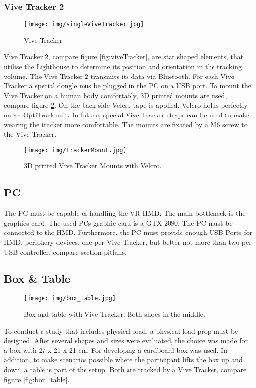 \subsubsection{Vive Tracker 2}
\begin{figure}
	\centering
	\texttt{[image: img/singleViveTracker.jpg]}
	\caption{Vive Tracker}
	\label{fig:singleViveTracker}
\end{figure}
Vive Tracker 2, compare figure \ref{fig:viveTracker}, are star shaped elements, that utilise the Lighthouse to determine its position and orientation in the tracking volume. The Vive Tracker 2 transmits its data via Bluetooth. For each Vive Tracker a special dongle mus be plugged in the PC on a USB port. To mount the Vive Tracker on a human body comfortably, 3D printed mounts are used, compare figure \ref{fig:trackerMount}. On the back side Velcro tape is applied. Velcro holds perfectly on an OptiTrack suit. In future, special Vive Tracker straps can be used to make wearing the tracker more comfortable. The mounts are fixated by a M6 screw to the Vive Tracker.
\begin{figure}
	\centering
	\texttt{[image: img/trackerMount.jpg]}
	\caption{3D printed Vive Tracker Mounts with Velcro.}
	\label{fig:trackerMount}
\end{figure}

\subsection{PC}
The PC must be capable of handling the VR HMD. The main bottleneck is the graphics card. The used PCs graphic card is a GTX 2080. The PC must be connected to the HMD. Furthermore, the PC must provide enough USB Ports for HMD, periphery devices, one per Vive Tracker, but better not more than two per USB controller, compare section pitfalls.

\subsection{Box \& Table}
\begin{figure}
	\centering
	\texttt{[image: img/box\_table.jpg]}
	\caption{Box and table with Vive Tracker. Both shoes in the middle.}
\end{figure}

To conduct a study that includes physical load, a physical load prop must be designed. After several shapes and sizes were evaluated, the choice was made for a box with 27 x 21 x 21 cm. For developing a cardboard box was used. In addition, to make scenarios possible where the participant lifts the box up and down, a table is part of the setup. Both are tracked by a Vive Tracker, compare figure \ref{fig:box_table}.


